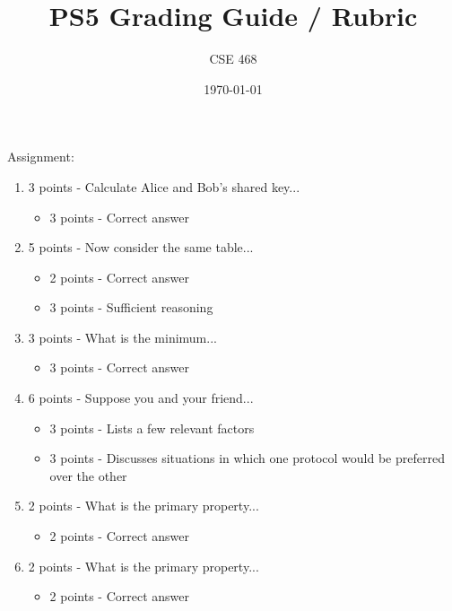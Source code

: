\documentclass[12pt]{article}
\title{PS5 Grading Guide / Rubric}
\author{CSE 468}
\date{\today}
\begin{document}
\maketitle

Assignment: 
\begin{enumerate}[font=\bfseries]
    \item 3 points - Calculate Alice and Bob's shared key...
        \begin{itemize}
            \item 3 points - Correct answer
        \end{itemize}
    \item 5 points - Now consider the same table...
        \begin{itemize}
            \item 2 points - Correct answer
            \item 3 points - Sufficient reasoning
        \end{itemize}
    \item 3 points - What is the minimum...
        \begin{itemize}
            \item 3 points - Correct answer
        \end{itemize}
    \item 6 points - Suppose you and your friend...
        \begin{itemize}
            \item 3 points - Lists a few relevant factors
            \item 3 points - Discusses situations in which one protocol would be preferred over the other
        \end{itemize}
    \item 2 points - What is the primary property...
        \begin{itemize}
            \item 2 points - Correct answer
        \end{itemize}
    \item 2 points - What is the primary property...
        \begin{itemize}
            \item 2 points - Correct answer
        \end{itemize}
\end{enumerate}
\end{document}
